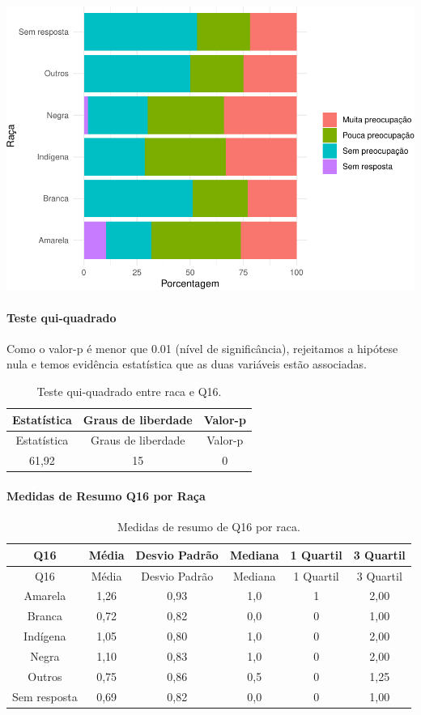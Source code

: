 \documentclass[]{article}
\let\oldparagraph\paragraph
\renewcommand{\paragraph}[1]{\oldparagraph{#1}\mbox{}}
\begin{document}
\begin{center}\includegraphics[width=0.75\linewidth]{relatorio_covid19_files/figure-latex/unnamed-chunk-162-1} \end{center}

\hypertarget{teste-qui-quadrado-15}{%
\paragraph{Teste qui-quadrado}\label{teste-qui-quadrado-15}}

Como o valor-p é menor que 0.01 (nível de significância), rejeitamos a hipótese nula e temos evidência estatística que as duas variáveis estão associadas.

\begin{longtable}[]{@{}ccc@{}}
\caption{\label{tab:unnamed-chunk-164}Teste qui-quadrado entre raca e Q16.}\tabularnewline
\toprule
Estatística & Graus de liberdade & Valor-p\tabularnewline
\midrule
\endfirsthead
\toprule
Estatística & Graus de liberdade & Valor-p\tabularnewline
\midrule
\endhead
61,92 & 15 & 0\tabularnewline
\bottomrule
\end{longtable}

\cleardoublepage

\hypertarget{medidas-de-resumo-q16-por-rauxe7a}{%
\paragraph{Medidas de Resumo Q16 por Raça}\label{medidas-de-resumo-q16-por-rauxe7a}}

\begin{longtable}[]{@{}cccccc@{}}
\caption{\label{tab:unnamed-chunk-165}Medidas de resumo de Q16 por raca.}\tabularnewline
\toprule
Q16 & Média & Desvio Padrão & Mediana & 1 Quartil & 3 Quartil\tabularnewline
\midrule
\endfirsthead
\toprule
Q16 & Média & Desvio Padrão & Mediana & 1 Quartil & 3 Quartil\tabularnewline
\midrule
\endhead
Amarela & 1,26 & 0,93 & 1,0 & 1 & 2,00\tabularnewline
Branca & 0,72 & 0,82 & 0,0 & 0 & 1,00\tabularnewline
Indígena & 1,05 & 0,80 & 1,0 & 0 & 2,00\tabularnewline
Negra & 1,10 & 0,83 & 1,0 & 0 & 2,00\tabularnewline
Outros & 0,75 & 0,86 & 0,5 & 0 & 1,25\tabularnewline
Sem resposta & 0,69 & 0,82 & 0,0 & 0 & 1,00\tabularnewline
\bottomrule
\end{longtable}
\end{document}
